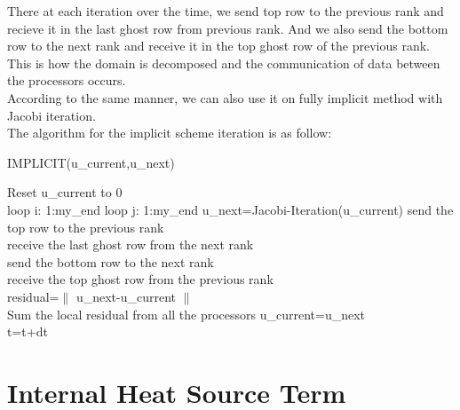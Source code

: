 \documentclass[10pt,a4paper]{report}
\begin{document}
There at each iteration over the time, we send top row to the previous rank and recieve it in the last ghost row from previous rank. And we also send the bottom row to the next rank and receive it in the top ghost row of the previous rank. This is how the domain is decomposed and the communication of data between the processors occurs.\\
According to the same manner, we can also use it on fully implicit method with Jacobi iteration.\\
The algorithm for the implicit scheme iteration is as follow:

\begin{algorithm}[h]
  \caption{IMPLICIT(u\_current,u\_next)}
  
  {
    Reset u\_current to 0\\
    {
	loop i: 1:my\_end\;	
    \Indp loop j: 1:my\_end\;
      	\Indp u\_next=Jacobi-Iteration(u\_current)\;
      	    \bigskip 
    \Indm \Indm send the top row to the previous rank\\
	receive the last ghost row from the next rank\\
	\bigskip 		
	send the bottom row to the next rank\\
	receive the top ghost row from the previous rank\\   
	\bigskip
    residual=$\parallel$ u\_next-u\_current $\parallel$  \\
    Sum the local residual from all the processors
    }
    u\_current=u\_next\\
    t=t+dt
  }
\end{algorithm}
\pagebreak





\section{Internal Heat Source Term}


\end{document}
